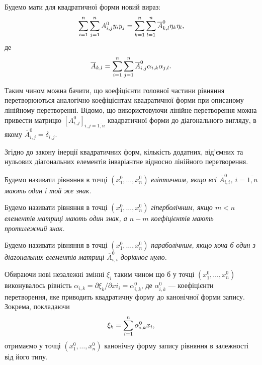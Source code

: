 Будемо мати для квадратичної форми новий вираз:
\begin{equation}
	\displaystyle\sum\limits_{i=1}^n \displaystyle\sum\limits_{j=1}^n A_{i,j}^0 y_iy_j = \displaystyle\sum\limits_{k=1}^n\displaystyle\sum\limits_{l=1}^n \overline{A}_{k,l}^0 \eta_k \eta_l,
\end{equation}
де 
\begin{equation}
	\overline{A}_{k,l} = \displaystyle\sum\limits_{i=1}^n \displaystyle\sum\limits_{j=1}^n \overline{A}_{i,j}^0 \alpha_{i,k}\alpha_{j,l}.
\end{equation}

Таким чином можна бачити, що коефіцієнти головної частини рівняння перетворюються аналогічно коефіцієнтам квадратичної форми при описаному лінійному перетворенні. Відомо, що використовуючи лінійне перетворення можна привести матрицю $\left[A_{i,j}^0\right]_{i,j=\overline{1,n}}$ квадратичної форми до діагонального вигляду, в якому $\overline{A}_{i,j}^0 = \delta_{i,j}$. \medskip

Згідно до закону інерції квадратичних форм, кількість додатних, від'ємних та нульових діагональних елементів інваріантне відносно лінійного перетворення.

\begin{definition}
	Будемо називати рівняння в точці $(x_1^0,\ldots,x_n^0)$ \it{еліптичним}, якщо всі $\overline{A}_{i,i}^0$, $i=\overline{1,n}$ мають один і той же знак. 
\end{definition}

\begin{definition}
	Будемо називати рівняння в точці $(x_1^0,\ldots,x_n^0)$ \it{гіперболічним}, якщо $m < n$ елементів матриці мають один знак, а $n - m$ коефіцієнтів мають протилежний знак. 
\end{definition}

\begin{definition}
	Будемо називати рівняння в точці $(x_1^0,\ldots,x_n^0)$ \it{параболічним}, якщо хоча б один з діагональних елементів матриці $\overline{A}_{i,i}^0$ дорівнює нулю. 
\end{definition}

Обираючи нові незалежні змінні $\xi_i$ таким чином що б у точці $(x_1^0,\ldots,x_n^0)$ виконувалось рівність $\alpha_{i,k}= \partial \xi_k / \partial xi_i = \alpha_{i,k}^0$, де $\alpha_{i,k}^0$ --- коефіцієнти перетворення, яке приводить квадратичну форму до канонічної форми запису. Зокрема, покладаючи
\begin{equation}
	\xi_k = \displaystyle\sum\limits_{i=1}^n \alpha_{i,k}^0 x_i,
\end{equation}
отримаємо у точці $(x_1^0,\ldots,x_n^0)$ канонічну форму запису рівняння в залежності від його типу.

